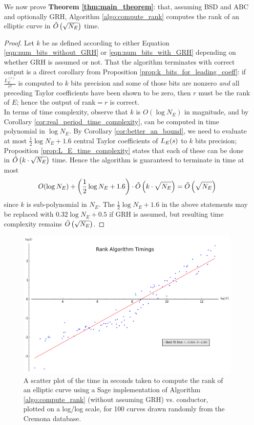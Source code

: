 We now prove {\bf Theorem \ref{thm:main_theorem}}: that, assuming BSD and ABC and optionally GRH, Algorithm \ref{algo:compute_rank} computes the rank of an elliptic curve in $\tilde{O}\left(\sqrt{N_E}\right)$ time.
\begin{proof}
Let $k$ be as defined according to either Equation \ref{eqn:num_bits_without_GRH} or \ref{eqn:num_bits_with_GRH} depending on whether GRH is assumed or not. That the algorithm terminates with correct output is a direct corollary from Proposition \ref{prop:k_bits_for_leading_coeff}: if $\frac{L_E^{(r)}}{r!}$ is computed to $k$ bits precision and some of those bits are nonzero {\it and} all preceding Taylor coefficients have been shown to be zero, then $r$ must be the rank of $E$; hence the output of rank$=r$ is correct. \\

In terms of time complexity, observe that $k$ is $O(\log N_E)$ in magnitude, and by Corollary \ref{cor:real_period_time_complexity}, can be computed in time polynomial in $\log N_E$. By Corollary \ref{cor:better_an_bound}, we need to evaluate at most $\frac{1}{2}\log N_E +1.6$ central Taylor coefficients of $L_E(s)$ to $k$ bits precision; Proposition \ref{prop:L_E_time_complexity} states that each of these can be done in $\tilde{O}\left(k\cdot \sqrt{N_E}\right)$ time. Hence the algorithm is guaranteed to terminate in time at most 
\begin{equation}
O(\log N_E) + \left(\frac{1}{2}\log N_E + 1.6\right) \cdot \tilde{O}\left(k\cdot \sqrt{N_E}\right) = \tilde{O}\left(\sqrt{N_E}\right)
\end{equation}
since $k$ is sub-polynomial in $N_E$. The $\frac{1}{2}\log N_E + 1.6$ in the above statements may be replaced with $0.32\log N_E + 0.5$ if GRH is assumed, but resulting time complexity remains $\tilde{O}\left(\sqrt{N_E}\right)$.
\end{proof}

\begin{figure}[!h]
    \centering
    \includegraphics[width=1.0\textwidth]{graphics/rank_algorithm_timings.png}
    \caption{A scatter plot of the time in seconds taken to compute the rank of an elliptic curve using a Sage implementation of Algorithm \ref{algo:compute_rank} (without assuming GRH) vs. conductor, plotted on a log/log scale, for 100 curves drawn randomly from the Cremona database.}
    \label{fig:rank_algorithm_timings}
\end{figure}

